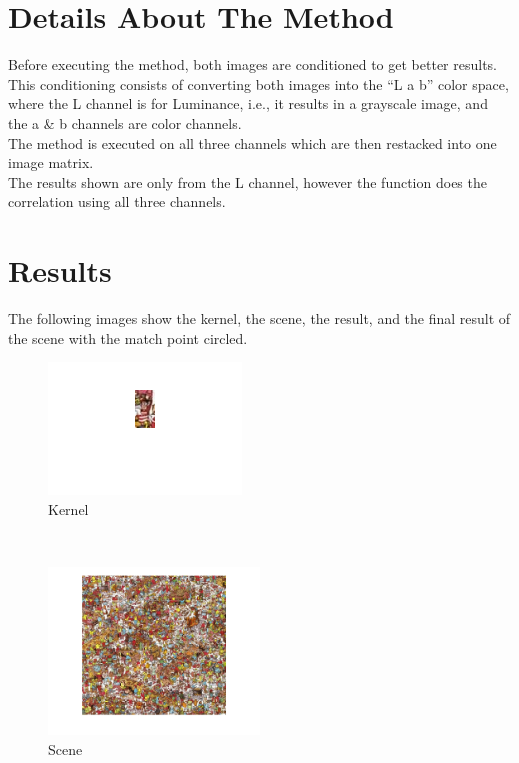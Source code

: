 \documentclass[letterpaper,11pt]{texMemo} %
\begin{document}
\section{Details About The Method}
Before executing the method, both images are conditioned to get better results. This conditioning consists of converting both images into the ``L a b'' color space, where the L channel is for Luminance, i.e., it results in a grayscale image, and the a \& b channels are color channels.\\
The method is executed on all three channels which are then restacked into one image matrix.\\
The results shown are only from the L channel, however the function does the correlation using all three channels.
\section{Results}
The following images show the kernel, the scene, the result, and the final result of the scene with the match point circled.
\begin{figure}[!h]
	\centering
		\includegraphics{kernel.png}
	\caption{Kernel}
	\label{fig:kernel}
\end{figure}
\\
\begin{figure}[!h]
	\centering
		\includegraphics[width=0.50\textwidth]{scene.png}
	\caption{Scene}
	\label{fig:scene}
\end{figure}
\\
\end{document}
